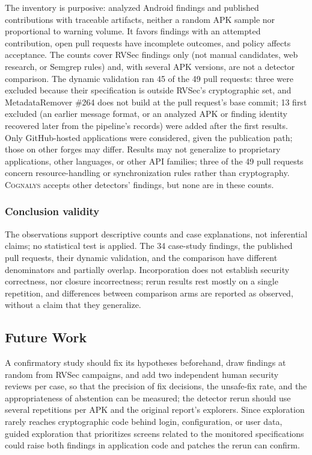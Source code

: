 \documentclass[conference]{IEEEtran}
\newcommand{\system}{\textsc{Cognalys}}
\begin{document}
The inventory is purposive: analyzed Android findings and published
contributions with traceable artifacts, neither a random APK sample nor
proportional to warning volume. It favors findings with an attempted
contribution, open pull requests have incomplete outcomes, and policy affects
acceptance. The counts cover RVSec findings only (not manual candidates, web
research, or Semgrep rules) and, with several APK versions, are not a detector
comparison.
The dynamic validation ran 45 of the 49 pull requests: three were excluded
because their specification is outside RVSec's cryptographic set, and
MetadataRemover \#264 does not build at the pull request's base commit; 13 first
excluded (an earlier message format, or an analyzed APK or finding identity
recovered later from the pipeline's records) were added after the first
results. Only GitHub-hosted applications were considered,
given the publication path; those on other forges may differ. Results may not generalize to proprietary applications, other
languages, or other API families; three of the 49 pull requests concern
resource-handling or synchronization rules rather than cryptography.
\system{} accepts other detectors' findings, but none are in these counts.

\subsubsection{Conclusion validity}

The observations support descriptive counts and case explanations, not
inferential claims; no statistical test is applied. The 34 case-study
findings, the published pull requests, their dynamic validation, and the
comparison have different denominators and partially overlap. Incorporation
does not establish security correctness, nor closure incorrectness; rerun
results rest mostly on a single repetition, and differences between comparison
arms are reported as observed, without a claim that they generalize.

\subsection{Future Work}

A confirmatory study should fix its hypotheses beforehand, draw findings at
random from RVSec campaigns, and add two independent human security reviews
per case, so that the precision of fix decisions, the unsafe-fix rate, and
the appropriateness of abstention can be measured; the detector rerun should
use several repetitions per APK and the original report's explorers. Since
exploration rarely reaches cryptographic code behind login, configuration, or
user data, guided exploration that prioritizes screens related to the
monitored specifications could raise both findings in application code and
patches the rerun can confirm.
\end{document}
